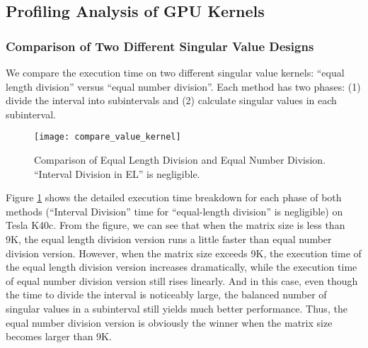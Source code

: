 \subsection{Profiling Analysis of GPU Kernels}

\subsubsection{Comparison of Two Different Singular Value Designs}
We compare the execution time on two different singular value kernels:
``equal length division'' versus ``equal number division''. Each
method has two phases: (1) divide the interval into subintervals and
(2) calculate singular values in each subinterval.
\begin{figure}[hbpt]
\centering
\texttt{[image: compare\_value\_kernel]}
\caption{Comparison of Equal Length Division and Equal Number Division. ``Interval Division in EL'' is negligible. }
\label{fig:compare_value_kernel}
\vspace{-0.10in}
\end{figure}
Figure \ref{fig:compare_value_kernel} shows the detailed execution time breakdown for each phase of both methods (``Interval Division'' time for ``equal-length division'' is negligible) on Tesla K40c.
From the figure, we can see that when the matrix size is less than 9K, the equal length division version runs a little faster than equal number division version.
However, when the matrix size exceeds 9K, the execution time of the equal length division version increases dramatically, while the execution time of equal number division version still rises linearly.
And in this case, 
even though the time to divide the interval is noticeably
large, the balanced number of singular values in a subinterval
still yields much better performance.
Thus, the equal number division version is obviously the winner when the matrix size becomes larger than 9K.

